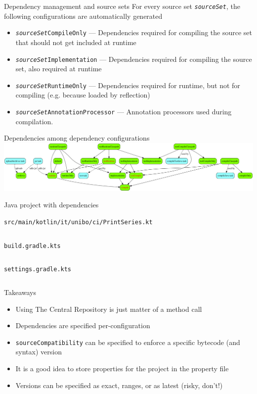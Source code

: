 \documentclass[presentation]{beamer}
\newcommand{\codefile}[4]{
	\begin{block}{\texttt{#2}}
		\inputminted[fontsize=#3,linenos=true,breaklines=true]{#4}{"workspace/#1/#2"}
	\end{block}
}
\newcommand{\kotlin}[3]{\codefile{#1}{#2}{#3}{kotlin}}
\begin{document}
\begin{frame}[fragile]{Dependency management and source sets}
    For every source set \texttt{\textit{sourceSet}}, the following configurations are automatically generated
    \begin{itemize}
        \item \texttt{\textit{sourceSet}CompileOnly} --- Dependencies required for compiling the source set that should not get included at runtime
        \item \texttt{\textit{sourceSet}Implementation} --- Dependencies required for compiling the source set, also required at runtime
        \item \texttt{\textit{sourceSet}RuntimeOnly} --- Dependencies required for runtime, but not for compiling (e.g. because loaded by reflection)
        \item \texttt{\textit{sourceSet}AnnotationProcessor} --- Annotation processors used during compilation.
    \end{itemize}
\end{frame}

\begin{frame}[fragile]{Dependencies among dependency configurations}
    \includegraphics[width=\textwidth]{img/javaPluginConfigurations}
\end{frame}

\begin{frame}{Java project with dependencies}
    \kotlin{01-dependencies}{src/main/kotlin/it/unibo/ci/PrintSeries.kt}{\tiny}
    \kotlin{01-dependencies}{build.gradle.kts}{\scriptsize}
    \kotlin{01-dependencies}{settings.gradle.kts}{\normalsize}
    \begin{block}{Takeaways}
        \begin{itemize}
            \item Using The Central Repository is just matter of a method call
            \item Dependencies are specified per-configuration
            \item \texttt{sourceCompatibility} can be specified to enforce a specific bytecode (and syntax) version
            \item It is a good idea to store properties for the project in the property file
            \item Versions can be specified as exact, ranges, or as latest (risky, don't!)
        \end{itemize}
    \end{block}
\end{frame}
\end{document}
